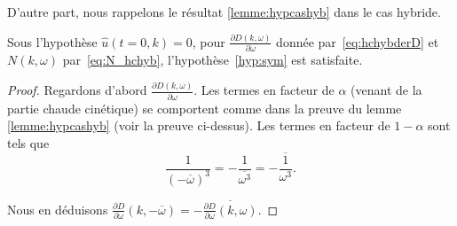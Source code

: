 D'autre part, nous rappelons le résultat \ref{lemme:hypcashyb} dans le cas hybride.
\begin{lemma}
  Sous l'hypothèse $\hat{u}(t=0,k)=0$, pour $\frac{\partial D(k,\omega)}{\partial\omega}$ donnée par~\eqref{eq:hchybderD} et $N(k,\omega)$ par~\eqref{eq:N_hchyb}, l'hypothèse~\ref{hyp:sym} est satisfaite.
\end{lemma}

\begin{proof}
  Regardons d'abord $\frac{\partial D(k,\omega)}{\partial\omega}$. Les termes en facteur de $\alpha$ (venant de la partie chaude cinétique) se comportent comme dans la preuve du lemme \ref{lemme:hypcashyb} (voir la preuve ci-dessus). Les termes en facteur de $1-\alpha$ sont tels que
  $$
    \frac{1}{(-\overline{\omega})^3}=-\frac{1}{\overline{\omega^3}}=-\overline{\frac{1}{\omega^3}}.
  $$

  Nous en déduisons $\frac{\partial D}{\partial \omega}(k,-\overline{\omega})=-\overline{\frac{\partial D}{\partial \omega}(k,\omega)}$.


\end{proof}
